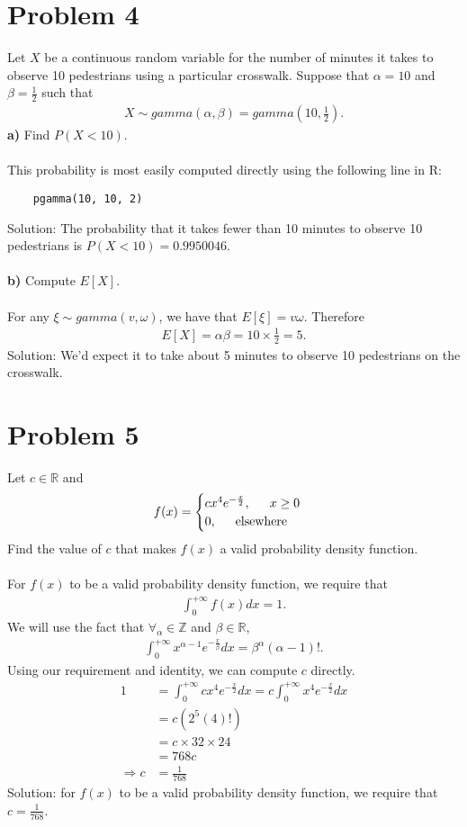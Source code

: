 \documentclass[11pt, letterpaper]{article}
\begin{document}
\section*{Problem 4}
Let $X$ be a continuous random variable for the number of minutes it takes to observe 10 pedestrians using
a particular crosswalk. Suppose that $\alpha=10$ and $\beta=\frac{1}{2}$ such that
\begin{align*}
    X\sim gamma(\alpha,\beta)=gamma(10,\frac{1}{2}).
\end{align*}
{\bf a)} Find $P(X<10)$. \\\\
This probability is most easily computed directly using the following line in R:
\begin{verbatim}
    pgamma(10, 10, 2)
\end{verbatim}
Solution: The probability that it takes fewer than 10 minutes to observe 10 pedestrians is $P(X<10)=0.9950046$.\\\\
{\bf b)} Compute $E[X]$.\\\\
For any $\xi\sim gamma(v,\omega)$, we have that $E[\xi]=v\omega$. Therefore
\begin{align*}
    E[X]=\alpha\beta=10\times\frac{1}{2}=5.
\end{align*}
Solution: We'd expect it to take about 5 minutes to observe 10 pedestrians on the crosswalk.
\section*{Problem 5}
Let $c\in\mathbb{R}$ and
\begin{align*}
    f(x)=
    \begin{cases}
        cx^4e^{-\frac{x}{2}},\indent x\geq 0\\
        0,\indent \text{elsewhere}
    \end{cases}
\end{align*}
Find the value of $c$ that makes $f(x)$ a valid probability density function.\\\\
For $f(x)$ to be a valid probability density function, we require that
\begin{align*}
    \int_0^{+\infty}f(x)dx=1.
\end{align*}
We will use the fact that $\forall_\alpha\in\mathbb{Z}$ and $\beta\in\mathbb{R}$,
\begin{align*}
    \int_0^{+\infty}x^{\alpha-1}e^{-\frac{x}{\beta}}dx=\beta^\alpha(\alpha - 1)!.
\end{align*}
Using our requirement and identity, we can compute $c$ directly.
\begin{align*}
    1&=\int_0^{+\infty}cx^4e^{-\frac{x}{2}}dx=c\int_0^{+\infty}x^4e^{-\frac{x}{2}}dx\\
    &=c\left(2^5(4)!\right)\\
    &=c\times 32\times 24\\
    &=768c\\
    \Rightarrow c&=\frac{1}{768}
\end{align*}
Solution: for $f(x)$ to be a valid probability density function, we require that $c=\frac{1}{768}$.
\end{document}
